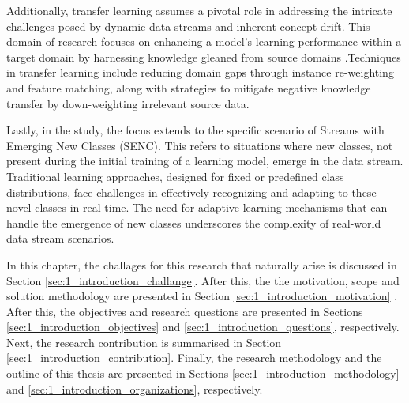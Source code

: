 Additionally, transfer learning assumes a pivotal role in addressing the intricate challenges posed by dynamic data streams and inherent concept drift. This domain of research focuses on enhancing a model's learning performance within a target domain by harnessing knowledge gleaned from source domains \cite{pan2009survey, wang2018systematic}.Techniques in transfer learning include reducing domain gaps through instance re-weighting and feature matching, along with strategies to mitigate negative knowledge transfer by down-weighting irrelevant source data.

Lastly, in the study, the focus extends to the specific scenario of Streams with Emerging New Classes (SENC). This refers to situations where new classes, not present during the initial training of a learning model, emerge in the data stream. Traditional learning approaches, designed for fixed or predefined class distributions, face challenges in effectively recognizing and adapting to these novel classes in real-time. The need for adaptive learning mechanisms that can handle the emergence of new classes underscores the complexity of real-world data stream scenarios.
     

In this chapter, the challages for this research 
that naturally arise is discussed in  Section \ref{sec:1_introduction_challange}. After this, the the motivation, scope and solution methodology are presented in Section \ref{sec:1_introduction_motivation} . After this, the objectives and
research questions are presented in Sections \ref{sec:1_introduction_objectives} and \ref{sec:1_introduction_questions}, respectively. Next, the
research contribution is summarised in Section \ref{sec:1_introduction_contribution}. Finally,
the research methodology and the outline of this thesis are presented in Sections \ref{sec:1_introduction_methodology} and
\ref{sec:1_introduction_organizations}, respectively.